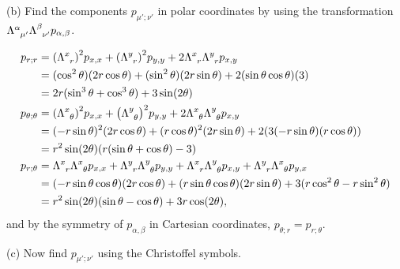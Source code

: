 \documentclass[gr-notes.tex]{subfiles}
\begin{document}
(b)
Find the components $p_{\mu';\nu'}$ in polar coordinates by using the transformation $\tensor{\Lambda}{^\alpha_{\mu'}} \tensor{\Lambda}{^\beta_{\nu'}} p_{\alpha,\beta}$.

\begin{align*}
  p_{r;r} &=
  \qty(\tensor{\Lambda}{^x_r})^2 p_{x,x} +
  \qty(\tensor{\Lambda}{^y_r})^2 p_{y,y} +
  2 \tensor{\Lambda}{^x_r} \tensor{\Lambda}{^y_r} p_{x,y}
  \\ &=
  (\cos^2\theta) (2 r \cos\theta) +
  (\sin^2\theta) (2 r \sin\theta) +
  2 (\sin\theta \cos\theta) (3)
  \\ &=
  2 r (\sin^3\theta + \cos^3\theta) + 3 \sin(2\theta)
  \\
  p_{\theta;\theta} &=
  \qty(\tensor{\Lambda}{^x_\theta})^2 p_{x,x} +
  \qty(\tensor{\Lambda}{^y_\theta})^2 p_{y,y} +
  2 \tensor{\Lambda}{^x_\theta} \tensor{\Lambda}{^y_\theta} p_{x,y}
  \\ &=
  (-r \sin\theta)^2 (2 r \cos\theta) +
  (r \cos\theta)^2 (2 r \sin\theta) +
  2 (3 (-r \sin\theta) (r \cos\theta))
  \\ &=
  r^2 \sin(2\theta) (r (\sin\theta + \cos\theta) - 3)
  \\
  p_{r;\theta} &=
  \tensor{\Lambda}{^x_r} \tensor{\Lambda}{^x_\theta} p_{x,x} +
  \tensor{\Lambda}{^y_r} \tensor{\Lambda}{^y_\theta} p_{y,y} +
  \tensor{\Lambda}{^x_r} \tensor{\Lambda}{^y_\theta} p_{x,y} +
  \tensor{\Lambda}{^y_r} \tensor{\Lambda}{^x_\theta} p_{y,x}
  \\ &=
  (-r \sin\theta \cos\theta) (2 r \cos\theta) +
  (r \sin\theta \cos\theta) (2 r \sin\theta) +
  3 (r \cos^2\theta - r \sin^2\theta)
  \\ &=
  r^2 \sin(2\theta) (\sin\theta - \cos\theta) + 3 r \cos(2\theta),
\end{align*}
and by the symmetry of $p_{\alpha,\beta}$ in Cartesian coordinates, $p_{\theta;r} = p_{r;\theta}$.

(c)
Now find $p_{\mu';\nu'}$ using the Christoffel symbols.
\end{document}
